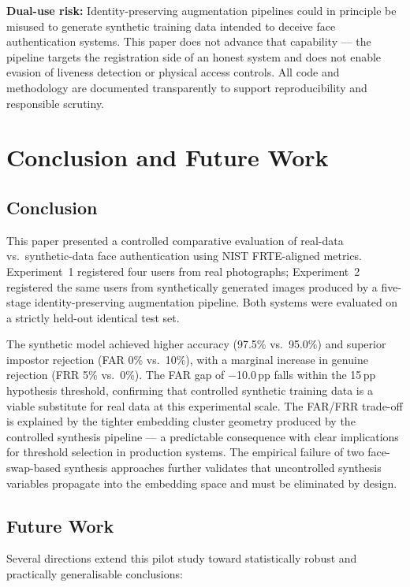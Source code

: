 \documentclass[conference]{IEEEtran}
\begin{document}
\textbf{Dual-use risk:} Identity-preserving augmentation pipelines could in principle be misused to generate synthetic training data intended to deceive face authentication systems. This paper does not advance that capability — the pipeline targets the registration side of an honest system and does not enable evasion of liveness detection or physical access controls. All code and methodology are documented transparently to support reproducibility and responsible scrutiny.

\section{Conclusion and Future Work}

\subsection{Conclusion}

This paper presented a controlled comparative evaluation of real-data vs.\ synthetic-data face authentication using NIST FRTE-aligned metrics. Experiment~1 registered four users from real photographs; Experiment~2 registered the same users from synthetically generated images produced by a five-stage identity-preserving augmentation pipeline. Both systems were evaluated on a strictly held-out identical test set.

The synthetic model achieved higher accuracy (97.5\% vs.\ 95.0\%) and superior impostor rejection (FAR 0\% vs.\ 10\%), with a marginal increase in genuine rejection (FRR 5\% vs.\ 0\%). The FAR gap of $-$10.0\,pp falls within the 15\,pp hypothesis threshold, confirming that controlled synthetic training data is a viable substitute for real data at this experimental scale. The FAR/FRR trade-off is explained by the tighter embedding cluster geometry produced by the controlled synthesis pipeline — a predictable consequence with clear implications for threshold selection in production systems. The empirical failure of two face-swap-based synthesis approaches further validates that uncontrolled synthesis variables propagate into the embedding space and must be eliminated by design.

\subsection{Future Work}

Several directions extend this pilot study toward statistically robust and practically generalisable conclusions:
\end{document}
